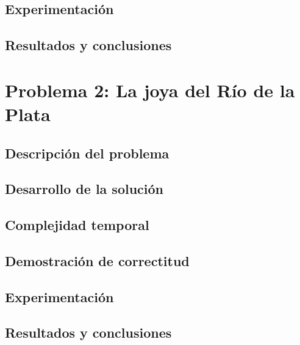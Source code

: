 \documentclass[a4paper, 10pt, twoside]{article}
\begin{document}
\subsection{Experimentación}


\subsection{Resultados y conclusiones}


\newpage



\section{Problema 2: La joya del Río de la Plata}

\subsection{Descripción del problema}


\subsection{Desarrollo de la solución}


\subsection{Complejidad temporal}


\subsection{Demostración de correctitud}


\subsection{Experimentación}


\subsection{Resultados y conclusiones}

\end{document}
